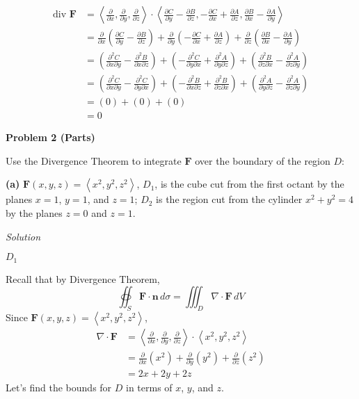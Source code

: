 \documentclass{article}
\newcommand{\lrp}[1]{\left( #1 \right)}
\newcommand{\lra}[1]{\left\langle #1 \right\rangle}
\newcommand{\F}[0]{\mathbf{F}}
\newcommand{\n}[0]{{\mathbf{n}}}
\newcommand{\Solution}{\textit{Solution}}
\begin{document}
\begin{align*}
    \text{div }\F&=\lra{\frac{\partial}{\partial x},\frac{\partial}{\partial y},\frac{\partial}{\partial z}}\cdot \lra{\frac{\partial C}{\partial y}-\frac{\partial B}{\partial z}, -\frac{\partial C}{\partial x}+\frac{\partial A}{\partial z},\frac{\partial B}{\partial x}-\frac{\partial A}{\partial y}}\\
    &=\frac{\partial }{\partial x}\lrp{ \frac{\partial C}{\partial y}-\frac{\partial B}{\partial z}}+\frac{\partial }{\partial y}\lrp{- \frac{\partial C}{\partial x}+\frac{\partial A}{\partial z}}+\frac{\partial }{\partial z}\lrp{ \frac{\partial B}{\partial x}-\frac{\partial A}{\partial y}}\\
    &=\lrp{\frac{\partial^2 C}{\partial x \partial y}- \frac{\partial ^2 B}{\partial x\partial z}}+\lrp{-\frac{\partial^2 C}{\partial y \partial x}+ \frac{\partial ^2 A}{\partial y\partial z}}+\lrp{\frac{\partial^2 B}{\partial z \partial x}- \frac{\partial ^2 A}{\partial z\partial y}}\\
    &= \lrp{\frac{\partial ^2 C}{\partial x \partial y}-\frac{\partial ^2 C}{\partial y \partial x}}+\lrp{-\frac{\partial^2 B}{\partial x\partial z}+\frac{\partial^2 B}{\partial z\partial x}}+\lrp{\frac{\partial ^2 A}{\partial y\partial z}-\frac{\partial^2 A}{\partial z\partial y}}\tag{rearrange}\\
    &=\lrp{0}+\lrp{0}+\lrp{0}\tag{mixed second partial derivatives are equal}\\
    &=\boxed{0}
\end{align*}
{}\textbf{Problem 2 (Parts)}

Use the Divergence Theorem to integrate $\F$ over the boundary of the region $D$:

{}\textbf{(a)} $\F(x,y,z)=\lra{x^2,y^2,z^2}$, $D_1$, is the cube cut from the first octant by the planes $x=1$, $y=1$, and $z=1$; $D_2$ is the region cut from the cylinder $x^2+y^2=4$ by the planes $z=0$ and $z=1$.

\Solution


{} $D_1$

Recall that by Divergence Theorem,
\begin{equation*}
    \oiint_S \F\cdot \n \,d\sigma = \iiint_D \nabla \cdot \F\,dV
\end{equation*}
Since $\F(x,y,z)=\lra{x^2,y^2,z^2}$,
\begin{align*}
    \nabla \cdot \F&=\lra{\frac{\partial }{\partial x},\frac{\partial }{\partial y},\frac{\partial }{\partial z}}\cdot \lra{x^2,y^2,z^2}\\
    &=\frac{\partial}{\partial x}\lrp{x^2}+\frac{\partial}{\partial y}\lrp{y^2}+\frac{\partial}{\partial z}\lrp{z^2}\\
    &=2x+2y+2z
\end{align*}
Let's find the bounds for $D$ in terms of $x$, $y$, and $z$.
\end{document}
